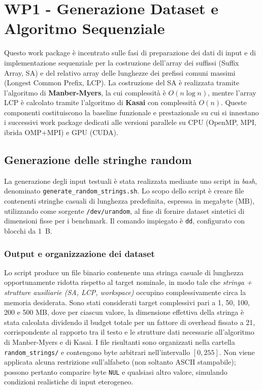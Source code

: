 \chapter{WP1 - Generazione Dataset e Algoritmo Sequenziale}
	
	Questo work package è incentrato sulle fasi di preparazione dei dati di input e di implementazione sequenziale per la costruzione dell’array dei suffissi (Suffix Array, SA) e del relativo array delle lunghezze dei prefissi comuni massimi (Longest Common Prefix, LCP).
	La costruzione del SA è realizzata tramite l’algoritmo di \textbf{Manber-Myers}, la cui complessità è $O(n \log n)$, mentre l’array LCP è calcolato tramite l’algoritmo di \textbf{Kasai} con complessità $O(n)$.
	Queste componenti costituiscono la baseline funzionale e prestazionale su cui si innestano i successivi work package dedicati alle versioni parallele su CPU (OpenMP, MPI, ibrida OMP+MPI) e GPU (CUDA).
	
	\section{Generazione delle stringhe random}
		La generazione degli input testuali è stata realizzata mediante uno script in \textit{bash}, denominato \texttt{generate\_random\_strings.sh}.
		Lo scopo dello script è creare file contenenti stringhe casuali di lunghezza predefinita, espressa in megabyte (MB), utilizzando come sorgente \texttt{/dev/urandom}, al fine di fornire dataset sintetici di dimensioni fisse per i benchmark.
		Il comando impiegato è \texttt{dd}, configurato con blocchi da \SI{1}{B}.
		
		\subsection{Output e organizzazione dei dataset}
			Lo script produce un file binario contenente una stringa casuale di lunghezza opportunamente ridotta rispetto al target nominale, in modo tale che \emph{stringa + strutture ausiliarie (SA, LCP, workspace)} occupino complessivamente circa la memoria desiderata.
			Sono stati considerati target complessivi pari a 1, 50, 100, 200 e 500 MB, dove per ciascun valore, la dimensione effettiva della stringa è stata calcolata dividendo il budget totale per un fattore di overhead fissato a 21, corrispondente al rapporto tra il testo e le strutture dati necessarie all’algoritmo di Manber-Myers e di Kasai.
			I file risultanti sono organizzati nella cartella \texttt{random\_strings/} e contengono byte arbitrari nell'intervallo $[0,255]$.
			Non viene applicata alcuna restrizione sull'alfabeto (non soltanto ASCII stampabile); possono pertanto comparire byte \texttt{NUL} e qualsiasi altro valore, simulando condizioni realistiche di input eterogeneo.
			
